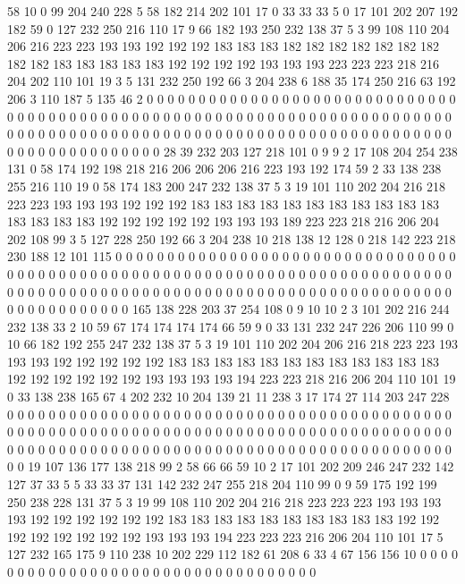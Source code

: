 58 10 0 99 204 240 228 5 58 182 214 202 101 17 0 33 33 33 5 0
17 101 202 207 192 182 59 0 127 232 250 216 110 17 9 66 182 193 250 232
138 37 5 3 99 108 110 204 206 216 223 223 193 193 192 192 192 183 183 183
182 182 182 182 182 182 182 182 182 183 183 183 183 183 192 192 192 192 193 193
193 223 223 223 218 216 204 202 110 101 19 3 5 131 232 250 192 66 3 204
238 6 188 35 174 250 216 63 192 206 3 110 187 5 135 46 2 0 0 0
0 0 0 0 0 0 0 0 0 0 0 0 0 0 0 0 0 0 0 0
0 0 0 0 0 0 0 0 0 0 0 0 0 0 0 0 0 0 0 0
0 0 0 0 0 0 0 0 0 0 0 0 0 0 0 0 0 0 0 0
0 0 0 0 0 0 0 0 0 0 0 0 0 0 0 0 0 0 0 0
0 0 0 0 0 0 0 0 0 0 0 0 0 0 0 0 0 0 0 0
0 0 0 0 0 0 0 0 0 0 0 0 0 0 0 0 0 0 0 0
0 0 0 0 0 0 0 0 28 39 232 203 127 218 101 0 9 9 2 17
108 204 254 238 131 0 58 174 192 198 218 216 206 206 206 216 223 193 192 174
59 2 33 138 238 255 216 110 19 0 58 174 183 200 247 232 138 37 5 3
19 101 110 202 204 216 218 223 223 193 193 193 192 192 192 183 183 183 183 183
183 183 183 183 183 183 183 183 183 183 192 192 192 192 192 193 193 193 189 223
223 218 216 206 204 202 108 99 3 5 127 228 250 192 66 3 204 238 10 218
138 12 128 0 218 142 223 218 230 188 12 101 115 0 0 0 0 0 0 0
0 0 0 0 0 0 0 0 0 0 0 0 0 0 0 0 0 0 0 0
0 0 0 0 0 0 0 0 0 0 0 0 0 0 0 0 0 0 0 0
0 0 0 0 0 0 0 0 0 0 0 0 0 0 0 0 0 0 0 0
0 0 0 0 0 0 0 0 0 0 0 0 0 0 0 0 0 0 0 0
0 0 0 0 0 0 0 0 0 0 0 0 0 0 0 0 0 0 0 0
0 0 0 0 0 0 0 0 0 0 0 0 0 0 0 0 0 0 0 0
0 0 0 0 165 138 228 203 37 254 108 0 9 10 10 2 3 101 202 216
244 232 138 33 2 10 59 67 174 174 174 174 66 59 9 0 33 131 232 247
226 206 110 99 0 10 66 182 192 255 247 232 138 37 5 3 19 101 110 202
204 206 216 218 223 223 193 193 193 192 192 192 192 192 183 183 183 183 183 183
183 183 183 183 183 183 192 192 192 192 192 192 193 193 193 193 194 223 223 218
216 206 204 110 101 19 0 33 138 238 165 67 4 202 232 10 204 139 21 11
238 3 17 174 27 114 203 247 228 0 0 0 0 0 0 0 0 0 0 0
0 0 0 0 0 0 0 0 0 0 0 0 0 0 0 0 0 0 0 0
0 0 0 0 0 0 0 0 0 0 0 0 0 0 0 0 0 0 0 0
0 0 0 0 0 0 0 0 0 0 0 0 0 0 0 0 0 0 0 0
0 0 0 0 0 0 0 0 0 0 0 0 0 0 0 0 0 0 0 0
0 0 0 0 0 0 0 0 0 0 0 0 0 0 0 0 0 0 0 0
0 0 0 0 0 0 0 0 0 0 0 0 0 0 0 0 0 0 0 0
19 107 136 177 138 218 99 2 58 66 66 59 10 2 17 101 202 209 246 247
232 142 127 37 33 5 5 33 33 37 131 142 232 247 255 218 204 110 99 0
9 59 175 192 199 250 238 228 131 37 5 3 19 99 108 110 202 204 216 218
223 223 223 193 193 193 193 192 192 192 192 192 192 183 183 183 183 183 183 183
183 183 183 192 192 192 192 192 192 192 192 193 193 193 194 223 223 223 216 206
204 110 101 17 5 127 232 165 175 9 110 238 10 202 229 112 182 61 208 6
33 4 67 156 156 10 0 0 0 0 0 0 0 0 0 0 0 0 0 0
0 0 0 0 0 0 0 0 0 0 0 0 0 0 0 0 0 0 0 0
